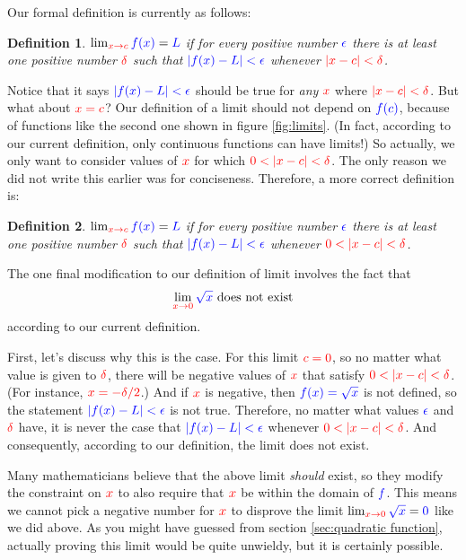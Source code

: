 \documentclass{myarticle}
\newcommand{\hor}[1]{\textcolor{red}{#1}}
\newcommand{\ver}[1]{\textcolor{blue}{#1}}
\theoremstyle{nospace}
\newtheorem*{oldattempt}{Definition}
\newenvironment{attempt}
{\begin{mdframed}\begin{oldattempt}}
    {\end{oldattempt}\end{mdframed}}
\newtheorem{old series theorem}{Theorem}
\newenvironment{series theorem}
{\begin{mdframed}\begin{old series theorem}}
    {\end{old series theorem}\end{mdframed}}
\begin{document}
Our formal definition is currently as follows:

\begin{attempt}
  $\lim_{\hor{x \to c}} \ver{f(x)} = \ver{L}$ if for every positive
  number $\ver{\epsilon}$ there is at least one positive number
  $\hor{\delta}$ such that $\ver{|f(x) - L| < \epsilon}$ whenever
  $\hor{|x - c| < \delta}$.
\end{attempt}

Notice that it says $\ver{|f(x) - L| < \epsilon}$ should be true for
\emph{any} $\hor{x}$ where $\hor{|x - c| < \delta}$. But what about
$\hor{x = c}$? Our definition of a limit should not depend on
$\ver{f(c)}$, because of functions like the second one shown in figure
\ref{fig:limits}. (In fact, according to our current definition, only
continuous functions can have limits!) So actually, we only want to
consider values of $\hor{x}$ for which $\hor{0 < |x - c| < \delta}$.
The only reason we did not write this earlier was for conciseness.
Therefore, a more correct definition is:

\begin{attempt}
  $\lim_{\hor{x \to c}} \ver{f(x)} = \ver{L}$ if for every positive
  number $\ver{\epsilon}$ there is at least one positive number
  $\hor{\delta}$ such that $\ver{|f(x) - L| < \epsilon}$ whenever
  $\hor{0 < |x - c| < \delta}$.
\end{attempt}

The one final modification to our definition of limit involves the
fact that
\[
  \lim_{\hor{x \to 0}} \ver{\sqrt{x}}\text{ does not exist}
\]
according to our current definition.

First, let's discuss why this is the case. For this limit
$\hor{c = 0}$, so no matter what value is given to $\hor{\delta}$,
there will be negative values of $\hor{x}$ that satisfy
$\hor{0 < |x - c| < \delta}$. (For instance, $\hor{x = -\delta/2}$.)
And if $\hor{x}$ is negative, then $\ver{f(x) = \sqrt{x}}$ is not
defined, so the statement $\ver{|f(x) - L| < \epsilon}$ is not true.
Therefore, no matter what values $\ver{\epsilon}$ and $\hor{\delta}$
have, it is never the case that $\ver{|f(x) - L| < \epsilon}$ whenever
$\hor{0 < |x - c| < \delta}$. And consequently, according to our
definition, the limit does not exist.

Many mathematicians believe that the above limit \emph{should} exist,
so they modify the constraint on $\hor{x}$ to also require that
$\hor{x}$ be within the domain of $\ver{f}$. This means we cannot pick
a negative number for $\hor{x}$ to disprove the limit
$\lim_{\hor{x \to 0}} \ver{\sqrt{x}} = \ver{0}$ like we did above. As
you might have guessed from section \ref{sec:quadratic function},
actually proving this limit would be quite unwieldy, but it is
certainly possible.
\end{document}
